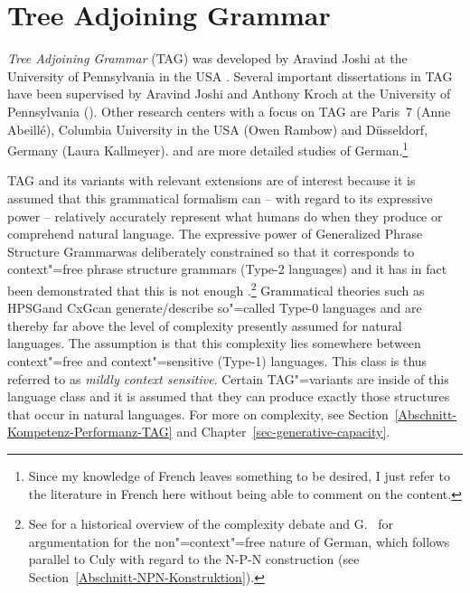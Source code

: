 
\chapter{Tree Adjoining Grammar}
\label{Kapitel-TAG}


\newcommand{\dotted}[0]{\makedash{2pt}}
\newcommand{\g}[1]{{\footnotesize $#1$}}


\emph{Tree Adjoining Grammar} (TAG)
was developed by Aravind Joshi at the University of Pennsylvania in the USA \citep*{JLT75a-u}. 
Several important dissertations in TAG have been supervised by Aravind
Joshi and Anthony Kroch at the University of Pennsylvania (\eg \citealp{Rambow94a}).
Other research centers with a focus on TAG are Paris~7 (Anne Abeill\'{e}), Columbia University in the USA
(Owen Rambow) and Düsseldorf, Germany (Laura Kallmeyer).
 and  are more detailed studies of German.\footnote{
	Since my knowledge of French leaves something to be desired, I just refer to the literature in French here without being
	able to comment on the content.%
}

TAG and its variants with relevant extensions are of interest because it is assumed that this grammatical formalism can -- with regard to its
expressive power -- relatively accurately represent what humans do when they produce or comprehend natural language.
The expressive power of Generalized Phrase Structure Grammar\indexgpsg was deliberately constrained so that it corresponds to context"=free
phrase structure grammars (Type-2 languages) and it has in fact been demonstrated that this is not enough \citep{Shieber85a,Culy85a}.\footnote{%
	See \citet{Pullum86a} for a historical overview of the complexity debate and G.\  for argumentation for the non"=context"=free nature
	of German, which follows parallel to  Culy with regard to the N-P-N construction (see Section~\ref{Abschnitt-NPN-Konstruktion}).%
	} Grammatical theories such as HPSG\indexhpsg and CxG\indexcxg can generate/describe so"=called Type-0 languages and are thereby far above the level
	of complexity presently assumed for natural languages. 
The assumption is that this complexity lies somewhere between context"=free
and context"=sensitive (Type-1) languages. This class is thus referred to as \emph{mildly context sensitive}.
Certain TAG"=variants are inside of this language class and it is assumed that they can produce exactly those structures that occur in
natural languages. For more on complexity, see Section~\ref{Abschnitt-Kompetenz-Performanz-TAG} and Chapter~\ref{sec-generative-capacity}.

